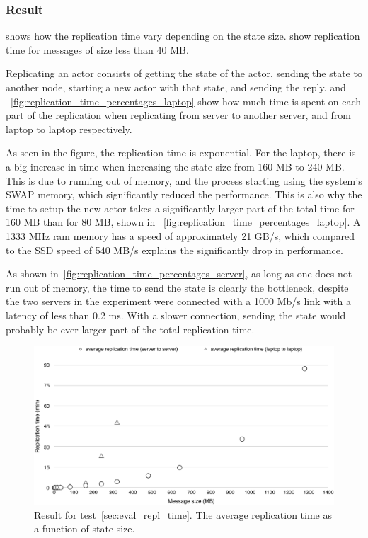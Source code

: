 \documentclass{cslthse-msc}
\begin{document}
\subsubsection*{Result}
 shows how the replication time vary depending on the state size.  show replication time for messages of size less than 40 MB. 

Replicating an actor consists of getting the state of the actor, sending the state to another node, starting a new actor with that state, and sending the reply.  and ~\cref{fig:replication_time_percentages_laptop} show how much time is spent on each part of the replication when replicating from server to another server, and from laptop to laptop respectively.

As seen in the figure, the replication time is exponential. For the laptop, there is a big increase in time when increasing the state size from 160 MB to 240 MB. This is due to running out of memory, and the process starting using the system's SWAP memory, which significantly reduced the performance. This is also why the time to setup the new actor takes a significantly larger part of the total time for 160 MB than for 80 MB, shown in ~\cref{fig:replication_time_percentages_laptop}. A 1333 MHz ram memory has a speed of approximately 21 GB/s, which compared to the SSD speed of 540 MB/s explains the significantly drop in performance.

As shown in~\cref{fig:replication_time_percentages_server}, as long as one does not run out of memory, the time to send the state is clearly the bottleneck, despite the two servers in the experiment were connected with a 1000 Mb/s link with a latency of less than 0.2 ms. With a slower connection, sending the state would probably be ever larger part of the total replication time.


\begin{figure}[!hbt]
\centering
\includegraphics[scale=0.5]{images/results/replication_time.pdf} 
\caption{Result for test~\ref{sec:eval_repl_time}. The average replication time as a function of state size.}\label{fig:replication_time}
\end{figure}
\end{document}

